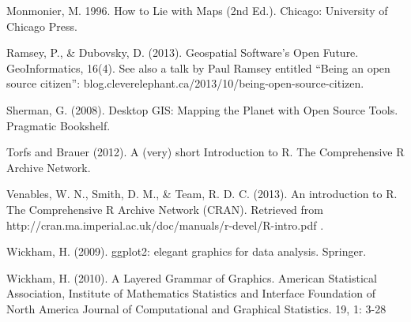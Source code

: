 \documentclass[]{article}
\newenvironment{Shaded}{}{}
\newcommand{\KeywordTok}[1]{\textcolor[rgb]{0.00,0.44,0.13}{\textbf{{#1}}}}
\newcommand{\StringTok}[1]{\textcolor[rgb]{0.25,0.44,0.63}{{#1}}}
\newcommand{\CommentTok}[1]{\textcolor[rgb]{0.38,0.63,0.69}{\textit{{#1}}}}
\newcommand{\NormalTok}[1]{{#1}}
\begin{document}
Monmonier, M. 1996. How to Lie with Maps (2nd Ed.). Chicago: University
of Chicago Press.

Ramsey, P., \& Dubovsky, D. (2013). Geospatial Software's Open Future.
GeoInformatics, 16(4). See also a talk by Paul Ramsey entitled ``Being
an open source citizen'':
blog.cleverelephant.ca/2013/10/being-open-source-citizen.

Sherman, G. (2008). Desktop GIS: Mapping the Planet with Open Source
Tools. Pragmatic Bookshelf.

Torfs and Brauer (2012). A (very) short Introduction to R. The
Comprehensive R Archive Network.

Venables, W. N., Smith, D. M., \& Team, R. D. C. (2013). An introduction
to R. The Comprehensive R Archive Network (CRAN). Retrieved from
http://cran.ma.imperial.ac.uk/doc/manuals/r-devel/R-intro.pdf .

Wickham, H. (2009). ggplot2: elegant graphics for data analysis.
Springer.

Wickham, H. (2010). A Layered Grammar of Graphics. American Statistical
Association, Institute of Mathematics Statistics and Interface
Foundation of North America Journal of Computational and Graphical
Statistics. 19, 1: 3-28

\end{document}
